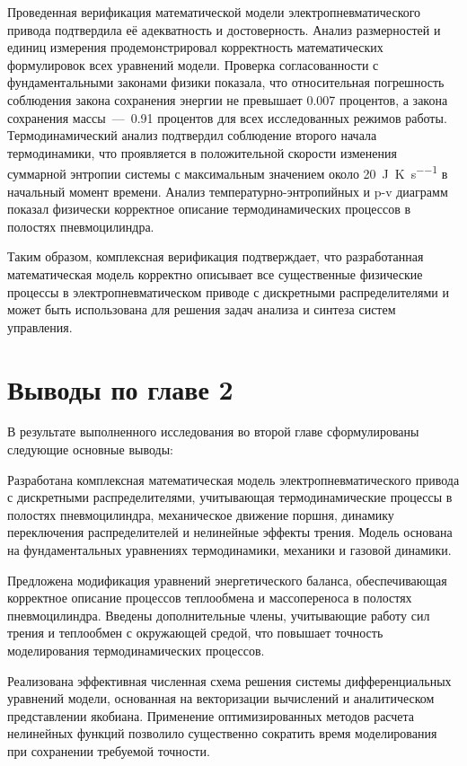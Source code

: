 Проведенная верификация математической модели электропневматического привода подтвердила её адекватность и достоверность.
Анализ размерностей и единиц измерения продемонстрировал корректность математических формулировок всех уравнений модели.
Проверка согласованности с фундаментальными законами физики показала, что относительная погрешность соблюдения
закона сохранения энергии не превышает \num{0.007} процентов, а закона сохранения массы~---~\num{0.91} процентов
для всех исследованных режимов работы.
Термодинамический анализ подтвердил соблюдение второго начала термодинамики,
что проявляется в положительной скорости изменения суммарной энтропии системы с максимальным значением
около \SI{20}{\joule\per\kelvin\per\second} в начальный момент времени. Анализ температурно-энтропийных
и p-v диаграмм показал физически корректное описание термодинамических процессов в полостях пневмоцилиндра.

Таким образом, комплексная верификация подтверждает, что разработанная математическая модель
корректно описывает все существенные физические процессы в электропневматическом приводе с
дискретными распределителями и может быть использована для решения задач анализа и синтеза систем управления.

\section{Выводы по главе 2}\label{sec:ch2/sec8}

В результате выполненного исследования во второй главе сформулированы следующие основные выводы:

Разработана комплексная математическая модель электропневматического привода с дискретными распределителями, учитывающая термодинамические процессы
в полостях пневмоцилиндра, механическое движение поршня, динамику переключения распределителей и нелинейные эффекты трения.
Модель основана на фундаментальных уравнениях термодинамики, механики и газовой динамики.

Предложена модификация уравнений энергетического баланса, обеспечивающая корректное описание процессов 
теплообмена и массопереноса в полостях пневмоцилиндра. Введены дополнительные члены, учитывающие работу сил трения
 и теплообмен с окружающей средой, что повышает точность моделирования термодинамических процессов.

Реализована эффективная численная схема решения системы дифференциальных уравнений модели, основанная на
векторизации вычислений и аналитическом представлении якобиана. Применение оптимизированных методов расчета
нелинейных функций позволило существенно сократить время моделирования при сохранении требуемой точности.

